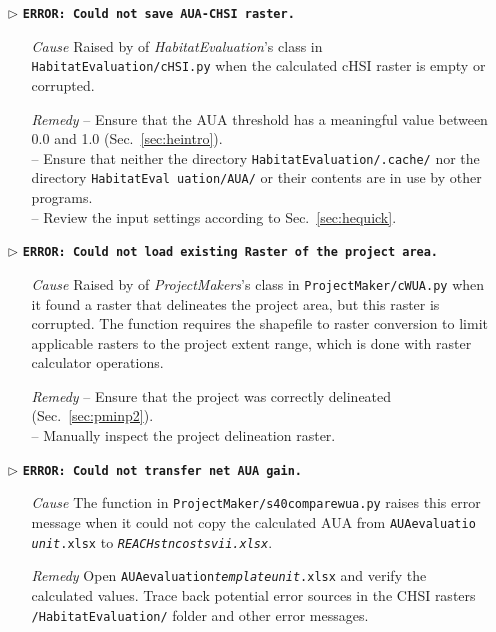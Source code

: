\begin{itemize}
	\item[$\triangleright$]\textbf{\texttt{ERROR: Could not save AUA-CHSI raster.}}
	\begin{itemize}
		\item[\textit{Cause}\hspace{0.27cm}] Raised by  of \textit{HabitatEvaluation}'s  class in \texttt{HabitatEvaluation/cHSI.py} when the calculated cHSI raster is empty or corrupted.
		\item[\textit{Remedy}] -- Ensure that the AUA threshold has a meaningful value between 0.0 and 1.0 (Sec.~\ref{sec:heintro}).\\
							 -- Ensure that neither the directory \texttt{HabitatEvaluation/.cache/} nor the directory \texttt{HabitatEval uation/AUA/} or their contents are in use by other programs.\\
							 -- Review the input settings according to Sec.~\ref{sec:hequick}.\\
	\end{itemize}
	
	\item[$\triangleright$]\textbf{\texttt{ERROR: Could not load existing Raster of the project area.}}
	\begin{itemize}
		\item[\textit{Cause}\hspace{0.27cm}] Raised by  of \textit{ProjectMakers}'s  class in \texttt{ProjectMaker/cWUA.py} when it found a raster that delineates the project area, but this raster is corrupted. The function requires the shapefile to raster conversion to limit applicable rasters to the project extent range, which is done with raster calculator operations.
		\item[\textit{Remedy}] -- Ensure that the project was correctly delineated (Sec.~\ref{sec:pminp2}).\\
							 -- Manually inspect the project delineation raster.\\
	\end{itemize}
	
	\item[$\triangleright$]\textbf{\texttt{ERROR: Could not transfer net AUA gain.}}
	\begin{itemize}
		\item[\textit{Cause}\hspace{0.27cm}] The  function in \texttt{ProjectMaker/s40{\myUnderscore}compare{\myUnderscore}wua.py} raises this error message when it could not copy the calculated AUA from \texttt{AUA{\myUnderscore}evaluatio\\\textit{{\myUnderscore}unit}.xlsx} to \texttt{\emph{REACH{\myUnderscore}stn{\myUnderscore}costs{\myUnderscore}vii.xlsx}}.
		\item[\textit{Remedy}] Open \texttt{AUA{\myUnderscore}evaluation\textit{{\myUnderscore}template{\myUnderscore}unit}.xlsx} and verify the calculated values. Trace back potential error sources in the CHSI rasters \texttt{/HabitatEvaluation/} folder and other error messages.\\
	\end{itemize}	
	

\end{itemize}
